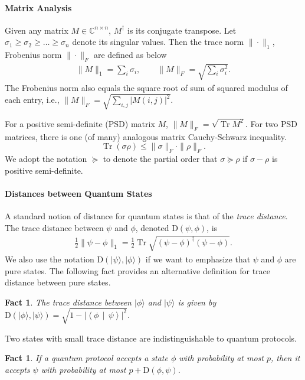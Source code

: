\documentclass[10pt,a4paper]{article}
\newtheorem{fact}[theorem]{Fact}
\theoremstyle{remark}
\newcommand{\C}{{\mathbb C}}
\newcommand{\abs}[1]{\ensuremath{\left\lvert #1 \right\rvert}}
\newcommand{\1}[1]{\mathds{1}{[#1]}}
\newcommand{\ket}[1]{\lvert #1\rangle}
\newcommand{\braket}[2]{\left\langle #1 \,\middle\vert\, #2\right\rangle}
\newcommand{\trace}{\operatorname{Tr}}
\newcommand{\TD}{\mathrm{D}}
\numberwithin{equation}{section}
\begin{document}
\paragraph{Matrix Analysis} Given any matrix $M\in \C^{n\times n}$, $M^\dagger$ is its  conjugate transpose. Let $\sigma_1 \ge \sigma_2 \ge \ldots \ge \sigma_n$ denote its singular values. Then the trace norm $\|\cdot\|_1$, Frobenius norm $\|\cdot\|_F$ are defined as below
\begin{align*}
    \|M\|_1 = \sum_i \sigma_i, \qquad \|M\|_F = \sqrt{\sum_i \sigma_i^2} .
\end{align*}
The Frobenius norm also equals the square root of sum of squared modulus of each entry, i.e., $\|M\|_F=\sqrt{\sum_{i,j} |M(i,j)|^2}$.

For a positive semi-definite (PSD) matrix $M$, $\|M\|_F = \sqrt{\trace M ^2}$.  
For two PSD matrices, there is one (of many) analogous matrix Cauchy-Schwarz inequality.
\begin{equation}\label{eq:matrix-cauchy-schwarz}
\trace(\sigma\rho)\le \|\sigma\|_F \cdot\|\rho\|_F.
\end{equation}
We adopt the notation $\succeq$ to denote the partial order  that $\sigma \succeq \rho$ if $\sigma-\rho$ is  positive semi-definite.

\paragraph{Distances between Quantum States}
A standard notion of distance for quantum states is that of the \emph{trace distance}. The trace distance between $\psi$ and $\phi$, denoted $\TD(\psi, \phi)$, is 
\begin{align}
\frac{1}{2}\|\psi-\phi\|_1 = \frac{1}{2}\trace\sqrt{( \psi - \phi)^\dagger (\psi-\phi)}.\label{eq:trace-dist}
\end{align}
We also use the notation $\TD(\ket\psi, \ket\phi)$ if we want to emphasize that $\psi$ and $\phi$ are pure states. The following fact provides an alternative definition for trace distance between pure states.
\begin{fact}\label{fact:trace-innerproduct}
  The trace distance between $\ket{\phi}$ and $\ket{\psi}$ is given by $\TD(\ket{\phi},\ket{\psi}) = \sqrt{1-\abs{\braket{\phi}{\psi}}^2}$.
\end{fact}

Two states with small trace distance are indistinguishable to quantum protocols.
\begin{fact}\label{fact:trace_norm_acc}
If a quantum protocol accepts a state $\phi$ with probability at most $p$, then it accepts $\psi$  with
  probability at most $p + \TD(\phi,\psi)$.
\end{fact}
\end{document}
